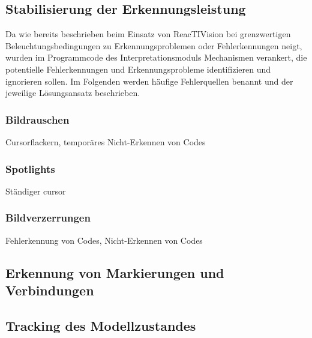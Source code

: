 
\subsection{Stabilisierung der Erkennungsleistung} %
\label{sub:stabilisierung_der_erkennungsleistung}

Da wie bereits beschrieben beim Einsatz von ReacTIVision bei grenzwertigen Beleuchtungsbedingungen zu Erkennungsproblemen oder Fehlerkennungen neigt, wurden im Programmcode des Interpretationsmoduls Mechanismen verankert, die potentielle Fehlerkennungen und Erkennungsprobleme identifizieren und ignorieren sollen. Im Folgenden werden häufige Fehlerquellen benannt und der jeweilige Lösungsansatz beschrieben.

\subsubsection{Bildrauschen} %
\label{ssub:bildrauschen}

Cursorflackern, temporäres Nicht-Erkennen von Codes


\subsubsection{Spotlights} %
\label{ssub:spotlights}

Ständiger cursor


\subsubsection{Bildverzerrungen} %
\label{ssub:bildverzerrungen}

Fehlerkennung von Codes, Nicht-Erkennen von Codes


\subsection{Erkennung von Markierungen und Verbindungen} %
\label{sub:erkennen_von_verbindungen}


\subsection{Tracking des Modellzustandes} %
\label{sub:tracking_des_modellzustandes}



